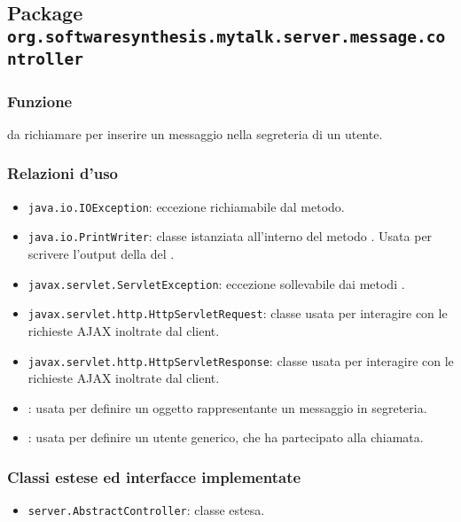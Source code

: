 \subsection{Package \texttt{org.softwaresynthesis.mytalk.server.message.controller}}\label{sec:messageServlet}


\subsubsection*{Funzione}
 da richiamare per inserire un messaggio nella segreteria di un utente.

\subsubsection*{Relazioni d'uso}
\begin{itemize}
	\item \texttt{java.io.IOException}: eccezione richiamabile dal metodo.
	\item \texttt{java.io.PrintWriter}: classe istanziata all'interno del metodo . Usata per scrivere l'output della del .
	\item \texttt{javax.servlet.ServletException}: eccezione sollevabile dai metodi .
	\item \texttt{javax.servlet.http.HttpServletRequest}: classe usata per interagire con le richieste AJAX inoltrate dal client.
	\item \texttt{javax.servlet.http.HttpServletResponse}: classe usata per interagire con le richieste AJAX inoltrate dal client.
	\item {}: usata per definire un oggetto rappresentante un messaggio in segreteria.
	\item {}: usata per definire un utente generico, che ha partecipato alla chiamata.
\end{itemize}

\subsubsection*{Classi estese ed interfacce implementate}
\begin{itemize}
	\item \texttt{server.AbstractController}: classe estesa.
\end{itemize}

